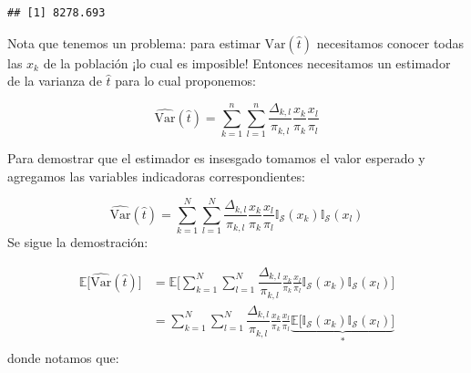 \documentclass[
]{book}
\newenvironment{Shaded}{\begin{snugshade}}{\end{snugshade}}
\newcommand{\DecValTok}[1]{\textcolor[rgb]{0.00,0.00,0.81}{#1}}
\newcommand{\FunctionTok}[1]{\textcolor[rgb]{0.00,0.00,0.00}{#1}}
\newcommand{\NormalTok}[1]{#1}
\newcommand{\OtherTok}[1]{\textcolor[rgb]{0.56,0.35,0.01}{#1}}
\newcommand{\SpecialCharTok}[1]{\textcolor[rgb]{0.00,0.00,0.00}{#1}}
\begin{document}
\begin{Shaded}
\end{Shaded}

\begin{verbatim}
## [1] 8278.693
\end{verbatim}

Nota que tenemos un problema: para estimar \(\textrm{Var}(\hat{t})\) necesitamos conocer todas las \(x_k\) de la población ¡lo cual es imposible! Entonces necesitamos un estimador de la varianza de \(\hat{t}\) para lo cual proponemos:

\[
\widehat{\textrm{Var}}(\hat{t}) = \sum\limits_{k = 1}^n \sum\limits_{l = 1}^n \dfrac{\Delta_{k,l}}{\pi_{k,l}} \frac{x_k}{\pi_k} \frac{x_l}{\pi_l}
\]

Para demostrar que el estimador es insesgado tomamos el valor esperado y agregamos las variables indicadoras correspondientes:

\[
\widehat{\textrm{Var}}(\hat{t})  = \sum\limits_{k = 1}^N \sum\limits_{l = 1}^N \dfrac{\Delta_{k,l}}{\pi_{k,l}} \frac{x_k}{\pi_k} \frac{x_l}{\pi_l} \mathbb{I}_{\mathcal{S}}(x_k) \mathbb{I}_{\mathcal{S}}(x_l) 
\]
Se sigue la demostración:

\begin{equation}\nonumber
\begin{aligned}
\mathbb{E}\Big[\widehat{\textrm{Var}}(\hat{t})  \Big] & = \mathbb{E}\bigg[ \sum\limits_{k = 1}^N \sum\limits_{l = 1}^N \dfrac{\Delta_{k,l}}{\pi_{k,l}} \frac{x_k}{\pi_k} \frac{x_l}{\pi_l} \mathbb{I}_{\mathcal{S}}(x_k) \mathbb{I}_{\mathcal{S}}(x_l) \bigg] \\
& = \sum\limits_{k = 1}^N \sum\limits_{l = 1}^N \dfrac{\Delta_{k,l}}{\pi_{k,l}} \frac{x_k}{\pi_k} \frac{x_l}{\pi_l} \underbrace{\mathbb{E}\bigg[  \mathbb{I}_{\mathcal{S}}(x_k) \mathbb{I}_{\mathcal{S}}(x_l) \bigg]}_{*} \\
\end{aligned}
\end{equation}
donde notamos que:
\end{document}
